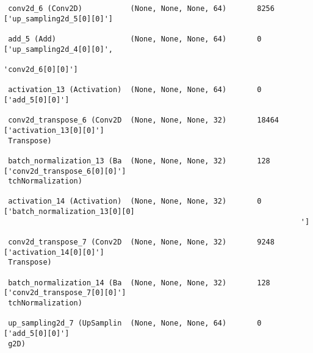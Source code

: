 \documentclass[
  letterpaper,
  DIV=11,
  numbers=noendperiod]{scrreprt}
\begin{document}
\begin{verbatim}
 conv2d_6 (Conv2D)           (None, None, None, 64)       8256      ['up_sampling2d_5[0][0]']     
                                                                                                  
 add_5 (Add)                 (None, None, None, 64)       0         ['up_sampling2d_4[0][0]',     
                                                                     'conv2d_6[0][0]']            
                                                                                                  
 activation_13 (Activation)  (None, None, None, 64)       0         ['add_5[0][0]']               
                                                                                                  
 conv2d_transpose_6 (Conv2D  (None, None, None, 32)       18464     ['activation_13[0][0]']       
 Transpose)                                                                                       
                                                                                                  
 batch_normalization_13 (Ba  (None, None, None, 32)       128       ['conv2d_transpose_6[0][0]']  
 tchNormalization)                                                                                
                                                                                                  
 activation_14 (Activation)  (None, None, None, 32)       0         ['batch_normalization_13[0][0]
                                                                    ']                            
                                                                                                  
 conv2d_transpose_7 (Conv2D  (None, None, None, 32)       9248      ['activation_14[0][0]']       
 Transpose)                                                                                       
                                                                                                  
 batch_normalization_14 (Ba  (None, None, None, 32)       128       ['conv2d_transpose_7[0][0]']  
 tchNormalization)                                                                                
                                                                                                  
 up_sampling2d_7 (UpSamplin  (None, None, None, 64)       0         ['add_5[0][0]']               
 g2D)                                                                                             
                                                                                                  

\end{verbatim}
\end{document}
